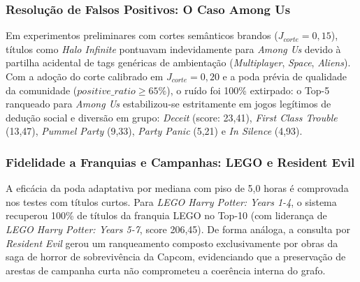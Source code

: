 \documentclass[conference]{IEEEtran}
\begin{document}
\subsubsection{Resolução de Falsos Positivos: O Caso Among Us}
Em experimentos preliminares com cortes semânticos brandos ($J_{corte} = 0{,}15$), títulos como \textit{Halo Infinite} pontuavam indevidamente para \textit{Among Us} devido à partilha acidental de tags genéricas de ambientação (\textit{Multiplayer}, \textit{Space}, \textit{Aliens}). Com a adoção do corte calibrado em $J_{corte} = 0{,}20$ e a poda prévia de qualidade da comunidade ($positive\_ratio \ge 65\%$), o ruído foi 100\% extirpado: o Top-5 ranqueado para \textit{Among Us} estabilizou-se estritamente em jogos legítimos de dedução social e diversão em grupo: \textit{Deceit} (score: 23,41), \textit{First Class Trouble} (13,47), \textit{Pummel Party} (9,33), \textit{Party Panic} (5,21) e \textit{In Silence} (4,93).

\subsubsection{Fidelidade a Franquias e Campanhas: LEGO e Resident Evil}
A eficácia da poda adaptativa por mediana com piso de 5,0 horas é comprovada nos testes com títulos curtos. Para \textit{LEGO Harry Potter: Years 1-4}, o sistema recuperou 100\% de títulos da franquia LEGO no Top-10 (com liderança de \textit{LEGO Harry Potter: Years 5-7}, score 206,45). De forma análoga, a consulta por \textit{Resident Evil} gerou um ranqueamento composto exclusivamente por obras da saga de horror de sobrevivência da Capcom, evidenciando que a preservação de arestas de campanha curta não comprometeu a coerência interna do grafo.
\end{document}
